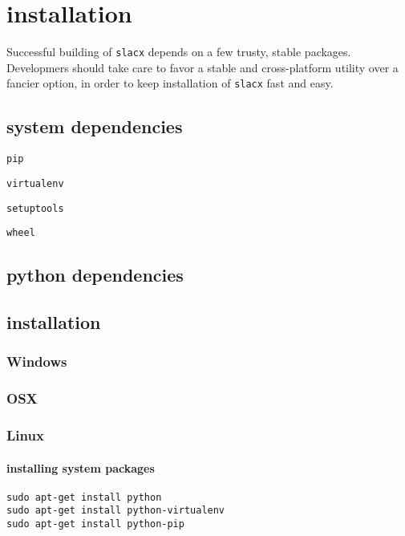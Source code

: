 \chapter{installation}
\label{ch:installation}

Successful building of \verb|slacx| depends on a few trusty, stable packages.
Developmers should take care to favor a stable and cross-platform utility
over a fancier option, in order to keep installation of \verb|slacx| fast and easy.

\section{system dependencies}

\verb|pip| 

\verb|virtualenv| 

\verb|setuptools| 

\verb|wheel| 


\section{python dependencies}


\section{installation}


\subsection{Windows}

\subsection{OSX}

\subsection{Linux}

\subsubsection{installing system packages}

\lstset{language=Bash}
\begin{lstlisting}
sudo apt-get install python
sudo apt-get install python-virtualenv
sudo apt-get install python-pip
\end{lstlisting}
\lstset{language=Python}

